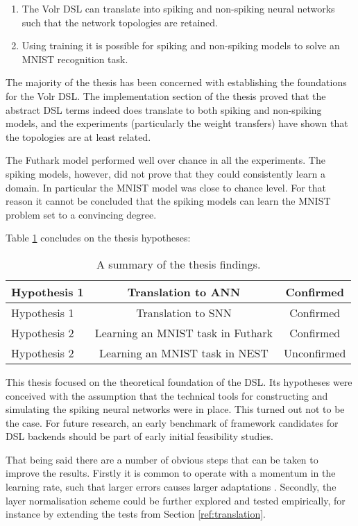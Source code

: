 \documentclass[report.tex]{subfiles}
\begin{document}
\begin{enumerate}
  \item The Volr DSL can translate into spiking and non-spiking neural networks such that the network topologies are retained.
  \item Using training it is possible for spiking and non-spiking models to solve an MNIST recognition task.
\end{enumerate}

The majority of the thesis has been concerned with establishing the foundations
for the Volr \gls{DSL}. 
The implementation section of the thesis proved that the abstract \gls{DSL}
terms indeed does translate to both spiking and non-spiking models, and the
experiments (particularly the weight transfers)
have shown that the topologies are at least related. 

The Futhark model performed well over chance in all the experiments.
The spiking models, however, did not prove that they could consistently learn a
domain. 
In particular the MNIST model was close to chance level.
For that reason it cannot be concluded that the spiking models can learn the
MNIST problem set to a convincing degree.

Table \ref{tab:findings} concludes on the thesis hypotheses:

\def\arraystretch{1.5}
\begin{table}
  \centering
  \begin{tabular}{l c c}
     Hypothesis 1 & Translation to \gls{ANN} & Confirmed \\ \hline
     Hypothesis 1 & Translation to \gls{SNN} & Confirmed \\ \hline
     Hypothesis 2 & Learning an MNIST task in Futhark & Confirmed \\ \hline
     Hypothesis 2 & Learning an MNIST task in NEST & Unconfirmed \\ \hline
  \end{tabular}
  \caption{A summary of the thesis findings.}
  \label{tab:findings}
\end{table}

This thesis focused on the theoretical foundation of the DSL.
Its hypotheses were conceived with the assumption that the
technical tools for constructing and simulating the spiking neural networks were
in place.
This turned out not to be the case.
For future research, an early benchmark of framework candidates for DSL backends
should be part of early initial feasibility studies.

That being said there are a number of obvious steps that can be taken to improve
the results.
Firstly it is common to operate with a momentum in the learning rate, such that
larger errors causes larger adaptations \cite{Montavon1998, Sutskever2013}.
Secondly, the layer normalisation scheme could be further explored and tested
empirically, for instance by extending the tests from Section
\ref{ref:translation}.
\end{document}
